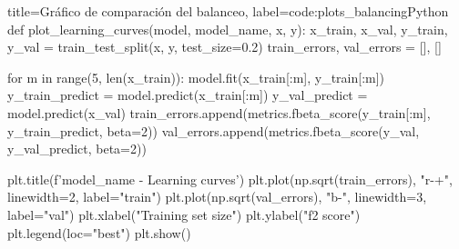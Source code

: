 \begin{code}[numbers=left]{title=Gráfico de comparación del balanceo, label=code:plots_balancing}{Python}
def plot_learning_curves(model, model_name, x, y):
    x_train, x_val, y_train, y_val = train_test_split(x, y, test_size=0.2)
    train_errors, val_errors = [], []
    
    for m in range(5, len(x_train)):
        model.fit(x_train[:m], y_train[:m])
        y_train_predict = model.predict(x_train[:m])
        y_val_predict = model.predict(x_val)
        train_errors.append(metrics.fbeta_score(y_train[:m], y_train_predict, beta=2))
        val_errors.append(metrics.fbeta_score(y_val, y_val_predict, beta=2))
        
    plt.title(f'{model_name} - Learning curves')
    plt.plot(np.sqrt(train_errors), "r-+", linewidth=2, label="train")
    plt.plot(np.sqrt(val_errors), "b-", linewidth=3, label="val")
    plt.xlabel("Training set size")
    plt.ylabel("f2 score")
    plt.legend(loc="best")
    plt.show()
\end{code}